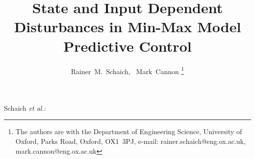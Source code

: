 \documentclass[journal]{IEEEtran}
\theoremstyle{remark}
\theoremstyle{definition}
\begin{document}
%
\title{State and Input Dependent Disturbances in Min-Max Model Predictive Control}
%
%
%

\author{Rainer~M.~Schaich,~
        Mark~Cannon
\thanks{The authors are with the Department of Engineering Science, University of
Oxford, Parks Road, Oxford, OX1~3PJ, e-mail: rainer.schaich@eng.ox.ac.uk, 
mark.cannon@eng.ox.ac.uk}%
}

% 
%



%
{Schaich \MakeLowercase{\textit{et al.}}: \thetitle}
% 
\end{document}
